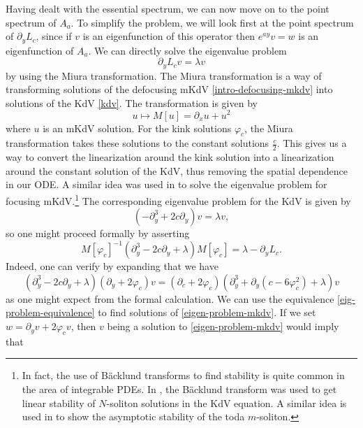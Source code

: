 Having dealt with the essential spectrum, we can now move on to the point spectrum of \(A_a\). To simplify the problem, we will look first at the point spectrum of \(\partial_y L_c\), since if \(v\) is an eigenfunction of this operator then \(e^{ay}v = w\) is an eigenfunction of \(A_a\). We can directly solve the eigenvalue problem
\begin{equation}\label{eigen-problem-mkdv}
	\partial_ yL_c v = \lambda v
\end{equation}
by using the Miura transformation. The Miura transformation is a way of transforming solutions of the defocusing mKdV \cref{intro-defocusing-mkdv} into solutions of the KdV \cref{kdv}. The transformation is given by
\begin{equation}
	u \mapsto M[u] = \partial_x u + u^2
\end{equation}
where \(u\) is an mKdV solution. For the kink solutions \(\varphi_c\), the Miura transformation takes these solutions to the constant solutions \(\frac c 2\). This gives us a way to convert the linearization around the kink solution into a linearization around the constant solution of the KdV, thus removing the spatial dependence in our ODE. A similar idea was used in \cite{pego1994asymptotic} to solve the eigenvalue problem for focusing mKdV.\footnote{In fact, the use of B\"acklund transforms to find stability is quite common in the area of integrable PDEs. In \cite{mizumachi2013asymptotic}, the B\"acklund transform was used to get linear stability of \(N\)-soliton solutions in the KdV equation. A similar idea is used in \cite{benes2012asymptotic} to show the asymptotic stability of the toda \(m\)-soliton.} The corresponding eigenvalue problem for the KdV is given by
\begin{equation}\label{eig-problem}
	(-\partial_y^3 + 2c \partial_y) v = \lambda v,
\end{equation}
so one might proceed formally by asserting
\begin{equation}
	M[\varphi_c]^{-1} (\partial_y^3 - 2c \partial_y + \lambda) M[\varphi_c]  = \lambda - \partial_y L_c.
\end{equation}
Indeed, one can verify by expanding that we have
\begin{equation}\label{eig-problem-equivalence}
	(\partial_y^3 - 2 c \partial_y + \lambda)(\partial_y + 2\varphi_c) v = (\partial_c + 2\varphi_c)(\partial_y^3 + \partial_y(c - 6\varphi_c^2) + \lambda) v
\end{equation}
as one might expect from the formal calculation. We can use the equivalence \cref{eig-problem-equivalence} to find solutions of \cref{eigen-problem-mkdv}. If we set \(w = \partial_yv + 2\varphi_c v\), then \(v\) being a solution to \cref{eigen-problem-mkdv} would imply that
